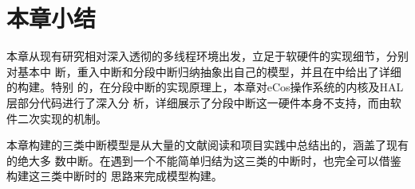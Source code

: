 \section{本章小结}
\label{sec:sum_3}

本章从现有研究相对深入透彻的多线程环境出发，立足于软硬件的实现细节，分别对基本中
断，重入中断和分段中断归纳抽象出自己的模型，并且在\uppaal 中给出了详细的构建。特别
的，在分段中断的实现原理上，本章对eCos操作系统的内核及HAL层部分代码进行了深入分
析，详细展示了分段中断这一硬件本身不支持，而由软件二次实现的机制。

本章构建的三类中断模型是从大量的文献阅读和项目实践中总结出的，涵盖了现有的绝大多
数中断。在遇到一个不能简单归结为这三类的中断时，也完全可以借鉴构建这三类中断时的
思路来完成模型构建。



